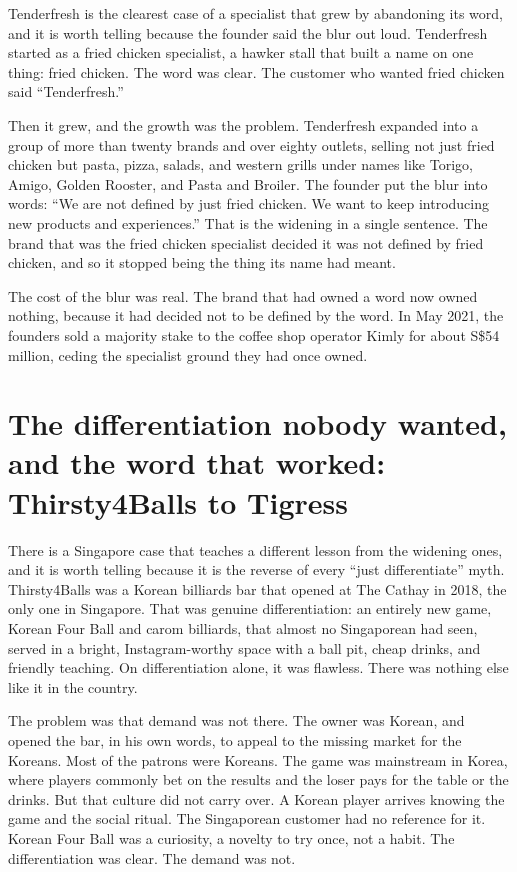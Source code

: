 \documentclass[10pt,twoside,openany]{memoir}
\newcommand{\needspacehead}{\needspace{4\baselineskip}}
\let\oldsection\section
\renewcommand{\section}{\needspacehead\oldsection}
\begin{document}
{Tenderfresh is the clearest case of a specialist that grew by abandoning
its word, and it is worth telling because the founder said the blur out
loud. Tenderfresh started as a fried chicken specialist, a hawker stall
that built a name on one thing: fried chicken. The word was clear. The
customer who wanted fried chicken said ``Tenderfresh.''

Then it grew, and the growth was the problem. Tenderfresh expanded into
a group of more than twenty brands and over eighty outlets, selling not
just fried chicken but pasta, pizza, salads, and western grills under
names like Torigo, Amigo, Golden Rooster, and Pasta and Broiler. The
founder put the blur into words: ``We are not defined by just fried
chicken. We want to keep introducing new products and experiences.''
That is the widening in a single sentence. The brand that was the fried
chicken specialist decided it was not defined by fried chicken, and so
it stopped being the thing its name had meant.

The cost of the blur was real. The brand that had owned a word now owned
nothing, because it had decided not to be defined by the word. In May
2021, the founders sold a majority stake to the coffee shop operator
Kimly for about S\$54 million, ceding the specialist ground they had
once owned.

\section{The differentiation nobody wanted, and the word that worked:
Thirsty4Balls to
Tigress}\label{the-differentiation-nobody-wanted-and-the-word-that-worked-thirsty4balls-to-tigress}

There is a Singapore case that teaches a different lesson from the
widening ones, and it is worth telling because it is the reverse of
every ``just differentiate'' myth. Thirsty4Balls was a Korean billiards
bar that opened at The Cathay in 2018, the only one in Singapore. That
was genuine differentiation: an entirely new game, Korean Four Ball and
carom billiards, that almost no Singaporean had seen, served in a
bright, Instagram-worthy space with a ball pit, cheap drinks, and
friendly teaching. On differentiation alone, it was flawless. There was
nothing else like it in the country.

The problem was that demand was not there. The owner was Korean, and
opened the bar, in his own words, to appeal to the missing market for
the Koreans. Most of the patrons were Koreans. The game was mainstream
in Korea, where players commonly bet on the results and the loser pays
for the table or the drinks. But that culture did not carry over. A
Korean player arrives knowing the game and the social ritual. The
Singaporean customer had no reference for it. Korean Four Ball was a
curiosity, a novelty to try once, not a habit. The differentiation was
clear. The demand was not.

}
\end{document}
